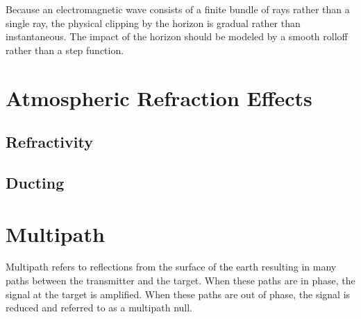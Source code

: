Because an electromagnetic wave consists of a finite bundle of rays rather than a single ray, the physical clipping by the horizon is gradual rather than instantaneous. The impact of the horizon should be modeled by a smooth rolloff rather than a step function.
  
\section{Atmospheric Refraction Effects}
\subsection{Refractivity}\label{env_sec:refractivity}

\subsection{Ducting}

\section{Multipath}
Multipath refers to reflections from the surface of the earth resulting in many paths between the transmitter and the target. When these paths are in phase, the signal at the target is amplified. When these paths are out of phase, the signal is reduced and referred to as a multipath null.

